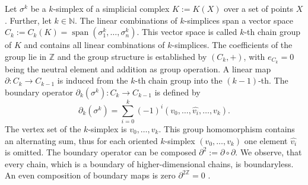 \documentclass[runningheads]{llncs}
\DeclareMathOperator{\SP}{\text{span}}
\begin{document}
Let $\sigma^k$ be a $k$-simplex of a simplicial complex $K := K(X)$ over a set of points $X$. Further, let $k \in \mathbb{N}$. The linear combinations of $k$-simplices span a vector space $C_k := C_k(K) = \SP\left(\sigma_1^k, \ldots, \sigma_n^k\right).$ This vector space is called $k$-th chain group of $K$ and contains all linear combinations of $k$-simplices. The coefficients of the group lie in $\mathbb{Z}$ and the group structure is established by $(C_k,+)$, with $e_{C_k}=0$ being the neutral element and addition as group operation. A linear map $\partial:C_k \rightarrow C_{k-1}$ is induced from the $k$-th chain group into the $(k-1)$-th.  The boundary operator $\partial_k(\sigma^k): C_k \rightarrow C_{k-1}$ is defined by
\begin{equation}
  \partial_k(\sigma^k) = \sum_{i=0}^{k} (-1)^i \left(v_0, \ldots, \widehat{v_i},\ldots,v_k\right).
\end{equation}
The vertex set of the $k$-simplex is $v_0,\ldots,v_k$. This group homomorphism contains an alternating sum, thus for each oriented $k$-simplex $(v_0, \ldots, v_k)$ one element $\widehat{v_i}$ is omitted. The boundary operator can be composed $\partial^2 := \partial \circ \partial$. We observe, that every chain, which is a boundary of higher-dimensional chains, is boundaryless. An even composition of boundary maps is zero $\partial^{2\mathbb{Z}} = 0$ \cite{hatcher2005algebraic}.
\end{document}
